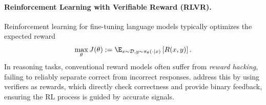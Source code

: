 \documentclass{article} %
\begin{document}
\paragraph{Reinforcement Learning with Verifiable Reward (RLVR).}
Reinforcement learning for fine-tuning language models typically optimizes the expected reward
\begin{equation}
\label{eq:rl-main-objective}
    \max_\theta \mathit{J}(\theta) := \E_{x \sim \mathcal{D}, y \sim \pi_\theta(\cdot\mid x)}\left[ R(x, y) \right].
\end{equation}
In reasoning tasks, conventional reward models often suffer from \emph{reward hacking}, failing to reliably separate correct from incorrect responses. \citet{guo2025deepseek} address this by using verifiers as rewards, which directly check correctness and provide binary feedback, ensuring the RL process is guided by accurate signals.
\end{document}
